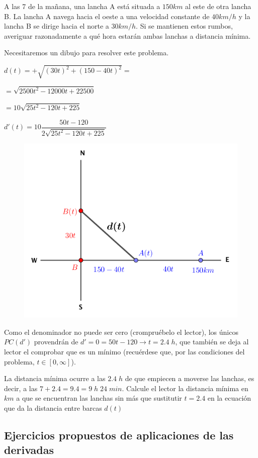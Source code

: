 	\begin{ejre} A las 7 de la mañana, una lancha A está situada a $150 km$ al este de otra lancha B. La lancha A navega hacia el oeste a una velocidad constante de $40 km/h$ y la lancha B se dirige hacia el norte a $30 km/h$. Si se mantienen estos rumbos, averiguar razonadamente a qué hora estarán ambas lanchas a distancia mínima.	
	\end{ejre}

	\begin{proofw}\renewcommand{\qedsymbol}{$\diamond$}	
	
	Necesitaremos un dibujo para resolver este problema.
	\begin{multicols}{2}
	$d(t)=+\sqrt{(30t)^2+(150-40t)^2}=$
	
	$=\sqrt{2500t^2-12000t+22500}$
	
	$=10\sqrt{25t^2-120t+225}	$
	

	
	$d'(t)=10 \dfrac {50t-120}{2\sqrt{25t^2-120t+225}}$ 	
	\begin{figure}[H]
	\centering
	\includegraphics[width=.45\textwidth]{imagenes/imagenes05/T05IM25.png}
	\end{figure}
	\end{multicols}	
	Como el denominador no puede ser cero (crompruébelo el lector), los únicos $PC(d')$ provendrán de $d'=0=50t-120 \to t=2.4\; h$, que también se deja al lector el comprobar que es un mínimo (recuérdese que, por las condiciones del problema, $t\in[0,\infty]$).

	La distancia mínima ocurre a las $2.4\; h$ de que empiecen a moverse las lanchas, es decir, a las $7+2.4=9.4=9\; h \; 24\; min$. Calcule el lector la distancia mínima en $km$ a que se encuentran las lanchas sin más que sustitutir $t=2.4$ en la ecuación que da la distancia entre barcas $d(t)$
	
	\end{proofw}

	

\subsection{Ejercicios propuestos de aplicaciones de las derivadas}

